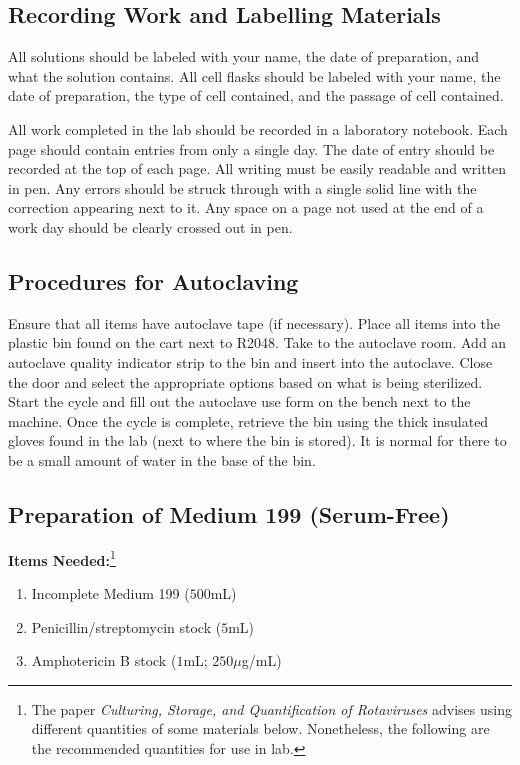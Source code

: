 \subsection{Recording Work and Labelling Materials}

All solutions should be labeled with your name, the date of preparation, and what the solution contains. All cell flasks should be labeled with your name, the date of preparation, the type of cell contained, and the passage of cell contained.

All work completed in the lab should be recorded in a laboratory notebook. Each page should contain entries from only a single day. The date of entry should be recorded at the top of each page. All writing must be easily readable and written in pen. Any errors should be struck through with a single solid line with the correction appearing next to it. Any space on a page not used at the end of a work day should be clearly crossed out in pen.

\subsection{Procedures for Autoclaving}

Ensure that all items have autoclave tape (if necessary). Place all items into the plastic bin found on the cart next to R2048. Take to the autoclave room. Add an autoclave quality indicator strip to the bin and insert into the autoclave. Close the door and select the appropriate options based on what is being sterilized. Start the cycle and fill out the autoclave use form on the bench next to the machine. Once the cycle is complete, retrieve the bin using the thick insulated gloves found in the lab (next to where the bin is stored). It is normal for there to be a small amount of water in the base of the bin.

\subsection{Preparation of Medium 199 (Serum-Free)}

{\bfseries Items Needed:}\footnote{The paper {\itshape Culturing, Storage, and Quantification of Rotaviruses} advises using different quantities of some materials below. Nonetheless, the following are the recommended quantities for use in lab.} \begin{enumerate}
	\item Incomplete Medium 199 ($500$mL)
	\item Penicillin/streptomycin stock ($5$mL)
	\item Amphotericin B stock ($1$mL; $250\mu$g/mL)
\end{enumerate}

